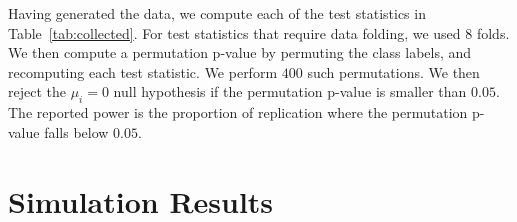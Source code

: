 \documentclass[12pt,a4paper]{article}
\begin{document}
Having generated the data, we compute each of the test statistics in Table~\ref{tab:collected}.
For test statistics that require data folding, we used $8$ folds. 
We then compute a permutation p-value by permuting the class labels, and recomputing each test statistic. 
We perform $400$ such permutations. 
We then reject the $\mu_i=0$ null hypothesis if the permutation p-value is smaller than $0.05$.
The reported power is the proportion of replication where the permutation p-value falls below $0.05$.




\newpage

\section{Simulation Results}
\label{apx:simulations}
\end{document}
